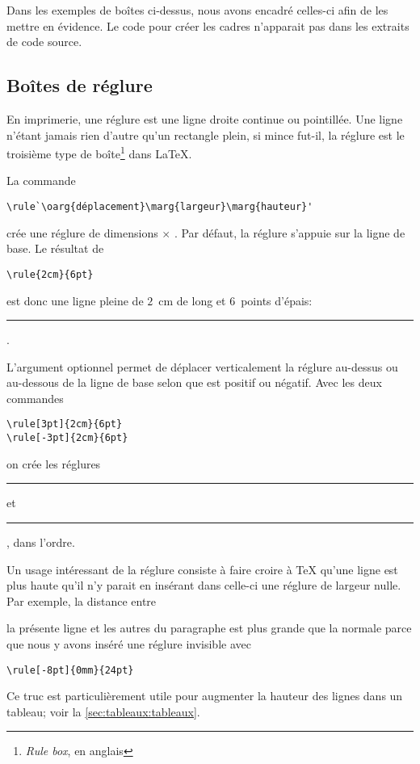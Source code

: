 \begin{rem}
  Dans les exemples de boîtes ci-dessus, nous avons encadré celles-ci
  afin de les mettre en évidence. Le code pour créer les cadres
  n'apparait pas dans les extraits de code source.
\end{rem}



\subsection{Boîtes de réglure}
\label{sec:tableaux:boites:rulebox}

En imprimerie, une réglure est une ligne droite continue ou
pointillée. Une ligne n'étant jamais rien d'autre qu'un rectangle
plein, si mince fut-il, la réglure est le troisième type de
boîte\footnote{%
  \emph{Rule box}, en anglais} %
dans {\LaTeX}.

La commande
\begin{lstlisting}
\rule`\oarg{déplacement}\marg{largeur}\marg{hauteur}'
\end{lstlisting}
crée une réglure de dimensions  $\times$ .
Par défaut, la réglure s'appuie sur la ligne de base. Le résultat de
\begin{lstlisting}
\rule{2cm}{6pt}
\end{lstlisting}
est donc une ligne pleine de $2$~cm de long et $6$~points d'épais:
\rule{2cm}{6pt}.

L'argument optionnel  permet de déplacer
verticalement la réglure au-dessus ou au-dessous de la ligne de base
selon que  est positif ou négatif. Avec les deux
commandes
\begin{lstlisting}
\rule[3pt]{2cm}{6pt}
\rule[-3pt]{2cm}{6pt}
\end{lstlisting}
on crée les réglures \rule[3pt]{2cm}{6pt} et \rule[-3pt]{2cm}{6pt},
dans l'ordre.

Un usage intéressant de la réglure consiste à faire croire à {\TeX}
qu'une ligne est plus haute qu'il n'y parait en insérant dans celle-ci
une réglure de largeur nulle. Par exemple, la distance entre
\rule[-8pt]{0mm}{24pt}\relax la présente ligne et les autres du paragraphe est
plus grande que la normale parce que nous y avons inséré une réglure
invisible avec
\begin{lstlisting}
\rule[-8pt]{0mm}{24pt}
\end{lstlisting}
Ce truc est particulièrement utile pour augmenter la hauteur des
lignes dans un tableau; voir la \autoref{sec:tableaux:tableaux}.



